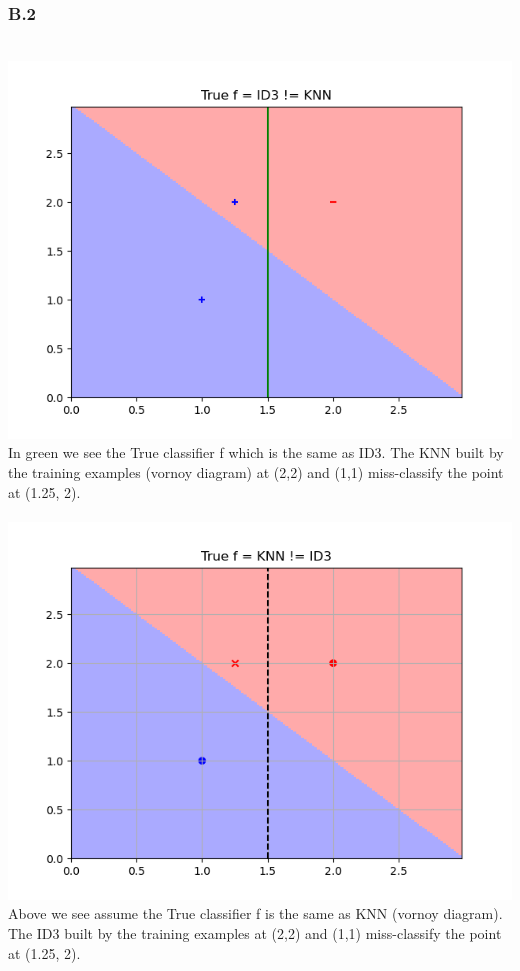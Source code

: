 \documentclass[12pt]{article}
\begin{document}
\subsubsection*{B.2}
\\
\includegraphics[scale=0.5]{hw3/plots/v1.PNG}\\
In green we see the True classifier f which is the same as ID3. The KNN built by the training examples (vornoy diagram) at (2,2) and (1,1) miss-classify the point at (1.25, 2).\\ 
\newpage
{}\\
\includegraphics[scale=0.5]{hw3/plots/v2.PNG}\\
Above we see assume the True classifier f is the same as KNN (vornoy diagram). The ID3 built by the training examples  at (2,2) and (1,1) miss-classify the point at (1.25, 2).\\ 
\end{document}
